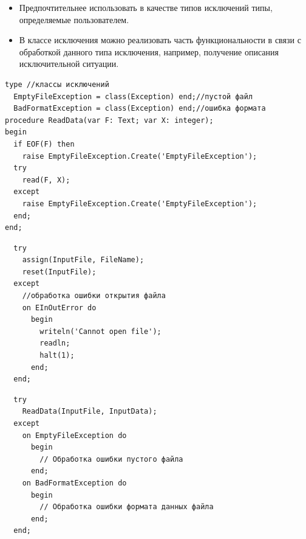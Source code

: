 \documentclass[xcolor=table]{beamer}
\begin{document}
\begin{frame}[fragile]
	\begin{itemize}
		\item Предпочтительнее использовать в качестве типов исключений типы, определяемые пользователем.
		\item В классе исключения можно реализовать часть функциональности в связи с обработкой данного типа исключения, например, получение описания исключительной ситуации.
	\end{itemize}
	\begin{verbatim}
type //классы исключений
  EmptyFileException = class(Exception) end;//пустой файл
  BadFormatException = class(Exception) end;//ошибка формата
procedure ReadData(var F: Text; var X: integer);
begin
  if EOF(F) then 
    raise EmptyFileException.Create('EmptyFileException');
  try 
    read(F, X);
  except
    raise EmptyFileException.Create('EmptyFileException');
  end;
end;
	\end{verbatim}
\end{frame}

\begin{frame}[fragile]
	\begin{verbatim}
  try
    assign(InputFile, FileName);
    reset(InputFile);
  except
    //обработка ошибки открытия файла
    on EInOutError do
      begin
        writeln('Cannot open file');
        readln;
        halt(1);
      end;
  end;
	\end{verbatim}
\end{frame}

\begin{frame}[fragile]
	\begin{verbatim}
  try
    ReadData(InputFile, InputData);
  except
    on EmptyFileException do
      begin
        // Обработка ошибки пустого файла
      end;
    on BadFormatException do
      begin
        // Обработка ошибки формата данных файла
      end;
  end;
	\end{verbatim}
\end{frame}
\end{document}
